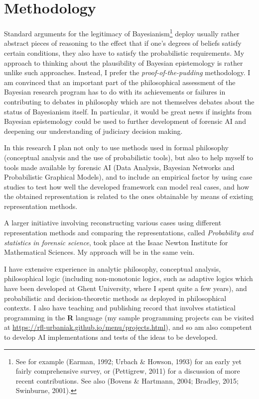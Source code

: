 \documentclass[11pt,dvipsnames,enabledeprecatedfontcommands]{scrartcl}
\begin{document}
\section{Methodology}\label{methodology}

Standard arguments for the legitimacy of Bayesianism\footnote{See for
  example (Earman, 1992; Urbach \& Howson, 1993) for an early yet fairly
  comprehensive survey, or (Pettigrew, 2011) for a discussion of more
  recent contributions. See also (Bovens \& Hartmann, 2004; Bradley,
  2015; Swinburne, 2001).} deploy usually rather abstract pieces of
reasoning to the effect that if one's degrees of beliefs satisfy certain
conditions, they also have to satisfy the probabilistic requirements. My
approach to thinking about the plausibility of Bayesian epistemology is
rather unlike such approaches. Instead, I prefer the
\emph{proof-of-the-pudding} methodology. I am convinced that an
important part of the philosophical assessment of the Bayesian research
program has to do with its achievements or failures in contributing to
debates in philosophy which are not themselves debates about the status
of Bayesianism itself. In particular, it would be great news if insights
from Bayesian epistemology could be used to further development of
forensic AI and deepening our understanding of judiciary decision
making.

In this research I plan not only to use methods used in formal
philosophy (conceptual analysis and the use of probabilistic tools), but
also to help myself to tools made available by forensic AI (Data
Analysis, Bayesian Networks and Probabilistic Graphical Models), and to
include an empirical factor by using case studies to test how well the
developed framework can model real cases, and how the obtained
representation is related to the ones obtainable by means of existing
representation methods.

A larger initiative involving reconstructing various cases using
different representation methods and comparing the representations,
called \emph{Probability and statistics in forensic science}, took place
at the Isaac Newton Institute for Mathematical Sciences. My approach
will be in the same vein.

I have extensive experience in analytic philosophy, conceptual analysis,
philosophical logic (including non-monotonic logics, such as adaptive
logics which have been developed at Ghent University, where I spent
quite a few years), and probabilistic and decision-theoretic methods as
deployed in philosophical contexts. I also have teaching and publishing
record that involves statistical programming in the \textsf{\textbf{R}}
language (my sample programming projects can be visited at
\url{https://rfl-urbaniak.github.io/menu/projects.html}), and so am also
competent to develop AI implementations and tests of the ideas to be
developed.
\end{document}
